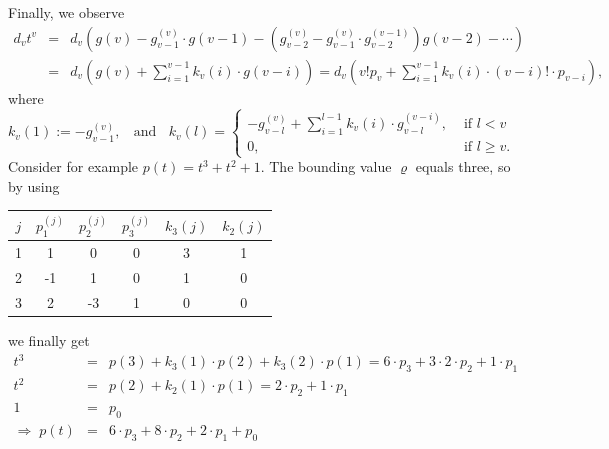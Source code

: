 \documentclass[a4paper,10pt]{article}
\theoremstyle{nonumberplain}
\begin{document}
Finally, we observe 
\begin{eqnarray*}
d_v t^v &=& d_v \left(  g(v) -g_{v-1}^{(v)} \cdot g(v-1) - (g_{v-2}^{(v)}- 
g_{v-1}^{(v)}\cdot g_{v-2}^{(v-1)} )g(v-2) - \cdots \right)     \\
&=& d_v \left( g(v) + \sum_{i=1}^{v-1}k_v(i) \cdot g(v-i) \right)  
= d_v \left( v! p_v + \sum_{i=1}^{v-1}k_v(i) \cdot (v-i)! \cdot p_{v-i} \right) ,
\end{eqnarray*}
where
$$k_v(1):=-g_{v-1}^{(v)}, \;\; \mbox{ and } \;\; 
k_v(l)=\left\lbrace \begin{array}{ll} -g_{v-l}^{(v)}+\sum_{i=1}^{l-1}k_v(i) \cdot g_{v-l}^{(v-i)},  & \mbox{ if } l<v\\
                                       0, & \mbox{ if } l \geq v.
                                        
                 \end{array} \right. $$
Consider for example $p(t)=t^3+t^2+1$. The bounding value $\varrho$ equals three, so by using
\begin{center}
\begin{tabular}{|c|c|c|c|c|c|}
\hline
$j$ & $p_1^{(j)}$ & $p_2^{(j)}$ & $p_3^{(j)}$ & $k_3(j)$ & $k_2(j)$\\
\hline
1 & 1 & 0 & 0 &  3 & 1\\
\hline 
2 & -1 & 1 & 0 & 1 & 0\\
\hline
3 & 2 & -3 & 1 & 0 & 0\\
\hline
\end{tabular}
\end{center}
we finally get
\begin{eqnarray*}
t^3 & = & p(3) + k_3(1) \cdot p(2) + k_3(2) \cdot p(1) = 6 \cdot p_3 + 3 \cdot 2 \cdot p_2 + 1 \cdot p_1 \\
t^2 & = & p(2) + k_2(1) \cdot p(1) = 2 \cdot p_2 + 1 \cdot p_1\\
1   & = & p_0 \\
\Rightarrow \;  p(t) &=& 6 \cdot p_3 + 8 \cdot p_2 + 2 \cdot p_1 + p_0 
\end{eqnarray*}
 
\end{document}
